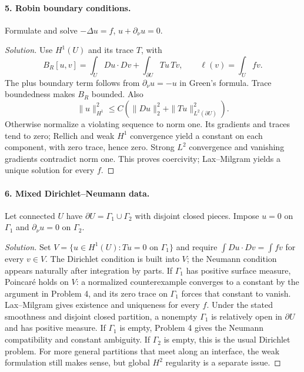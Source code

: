 \paragraph{5. Robin boundary conditions.}
Formulate and solve $-\Delta u=f$, $u+\partial_\nu u=0$.
\begin{proof}[Solution]
Use $H^1(U)$ and its trace $T$, with
\[
 B_R[u,v]=\int_U Du\cdot Dv+\int_{\partial U}Tu\,Tv,\qquad
 \ell(v)=\int_Ufv.
\]
The plus boundary term follows from $\partial_\nu u=-u$ in Green's formula.
Trace boundedness makes $B_R$ bounded. Also
\[
 \|u\|_{H^1}^2\leq C\left(\|Du\|_2^2+
                            \|Tu\|_{L^2(\partial U)}^2\right).
\]
Otherwise normalize a violating sequence to norm one. Its gradients
and traces tend to zero; Rellich and weak $H^1$ convergence yield a
constant on each component, with zero trace, hence zero.
Strong $L^2$ convergence and vanishing gradients contradict norm one.
This proves coercivity; Lax--Milgram yields a unique solution for every $f$.
\end{proof}
\Needspace{45mm}

\Needspace{30mm}

\Needspace{45mm}
\paragraph{6. Mixed Dirichlet--Neumann data.}
Let connected $U$ have $\partial U=\Gamma_1\cup\Gamma_2$ with disjoint
closed pieces. Impose $u=0$ on $\Gamma_1$ and $\partial_\nu u=0$ on $\Gamma_2$.
\begin{proof}[Solution]
Set $V=\{u\in H^1(U):Tu=0\text{ on }\Gamma_1\}$ and require
$\int Du\cdot Dv=\int fv$ for every $v\in V$.
The Dirichlet condition is built into $V$; the Neumann condition appears
naturally after integration by parts.
If $\Gamma_1$ has positive surface measure, Poincar\'e holds on $V$:
a normalized counterexample converges to a constant by the argument
in Problem 4, and its zero trace on $\Gamma_1$ forces that constant to vanish.
Lax--Milgram gives existence and uniqueness for every $f$.
Under the stated smoothness and disjoint closed partition, a nonempty
$\Gamma_1$ is relatively open in $\partial U$ and has positive measure.
If $\Gamma_1$ is empty, Problem 4 gives the Neumann compatibility and
constant ambiguity. If $\Gamma_2$ is empty, this is the usual Dirichlet problem.
For more general partitions that meet along an interface, the weak
formulation still makes sense, but global $H^2$ regularity is a separate issue.
\end{proof}

